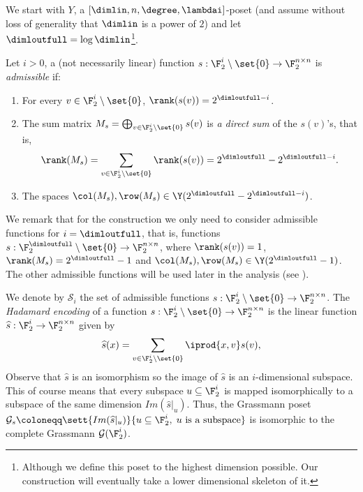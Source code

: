 We start with \(Y\), a \([\dimlin,n,\degree,\lambdai]\)-poset (and assume without loss of generality that \(\dimlin\) is a power of \(2\)) and let \(\dimloutfull = \log \dimlin\)\footnote{Although we define this poset to the highest dimension possible. Our construction will eventually take a lower dimensional skeleton of it.}.
\begin{definition} \label{def:admissible-func}
Let \(i > 0\), a (not necessarily linear) function \(s: \F_2^{i} \setminus \set{0} \to \F_2^{n \times n}\) is \emph{admissible} if:
    \begin{enumerate}
        \item For every \(v \in \F_2^i \setminus \set{0}\), \(\rank(s(v)) = 2^{\dimloutfull-i}\).
        \item The sum matrix \(M_s = \bigoplus_{v \in \F_2^i \setminus \set{0}}s(v)\) is \emph{a direct sum} of the \(s(v)\)'s, that is, \[\rank(M_s) = \sum_{v \in \F_2^i \setminus \set{0}} \rank(s(v)) = 2^{\dimloutfull}-2^{\dimloutfull-i}.\]
        \item The spaces \(\col(M_s), \row(M_s) \in \Y(2^{\dimloutfull}-2^{\dimloutfull-i})\). %
    \end{enumerate}
\end{definition}
We remark that for the construction we only need to consider admissible functions for \(i=\dimloutfull\), that is, functions \(s: \F_2^{\dimloutfull} \setminus \set{0} \to \F_2^{n \times n}\), where \(\rank(s(v))=1\), \(\rank(M_s) = 2^{\dimloutfull}-1\) and \(\col(M_s),\row(M_s) \in \Y(2^{\dimloutfull}-1)\). The other admissible functions will be used later in the analysis (see ).


We denote by \(\mathcal{S}_i\) the set of admissible functions \(s: \F_2^{i} \setminus \set{0} \to \F_2^{n \times n}\). The \emph{Hadamard encoding} of a function \(s: \F_2^{i} \setminus \set{0} \to \F_2^{n \times n}\) is the linear function \(\widehat{s}:\F_2^i \to \F_2^{n \times n}\) given by
\[\widehat{s}(x) = \sum_{v \in \F_2^i \setminus \set{0}} \iprod{x,v} s(v),\]
Observe that \(\widehat{s}\) is an isomorphism so the image of \(\widehat{s}\) is an \(i\)-dimensional subspace. This of course means that every subspace \(u \subseteq \F_2^{i}\) is mapped isomorphically to a subspace of the same dimension \(Im(\widehat{s}|_u)\). Thus, the Grassmann poset \(\mathcal{G}_{s} \coloneqq \sett{Im(\widehat{s}|_u)}{u \subseteq \F_2^i, \; u \text{ is a subspace}}\) is isomorphic to the complete Grassmann \(\mathcal{G}(\F_2^i)\). 

